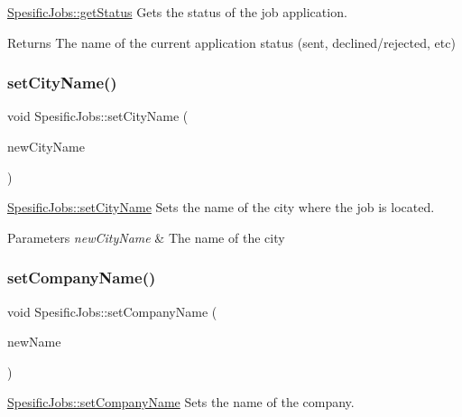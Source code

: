 \mbox{\hyperlink{class_spesific_jobs_aefe905d920961199fec0aff37a34b50d}{Spesific\+Jobs\+::get\+Status}} Gets the status of the job application. 

\begin{DoxyReturn}{Returns}
The name of the current application status (sent, declined/rejected, etc) 
\end{DoxyReturn}
\mbox{\label{class_spesific_jobs_a67b162aa9ad12ed8ffba061edff96cdf}} 
\subsubsection{\texorpdfstring{set\+City\+Name()}{setCityName()}}
{\footnotesize\ttfamily void Spesific\+Jobs\+::set\+City\+Name (\begin{DoxyParamCaption}\item[{Q\+String}]{new\+City\+Name }\end{DoxyParamCaption})}



\mbox{\hyperlink{class_spesific_jobs_a67b162aa9ad12ed8ffba061edff96cdf}{Spesific\+Jobs\+::set\+City\+Name}} Sets the name of the city where the job is located. 


\begin{DoxyParams}{Parameters}
{\em new\+City\+Name} & The name of the city \\
\hline
\end{DoxyParams}
\mbox{\label{class_spesific_jobs_aeacc56572911219fddf2f1439a70ed74}} 
\subsubsection{\texorpdfstring{set\+Company\+Name()}{setCompanyName()}}
{\footnotesize\ttfamily void Spesific\+Jobs\+::set\+Company\+Name (\begin{DoxyParamCaption}\item[{Q\+String}]{new\+Name }\end{DoxyParamCaption})}



\mbox{\hyperlink{class_spesific_jobs_aeacc56572911219fddf2f1439a70ed74}{Spesific\+Jobs\+::set\+Company\+Name}} Sets the name of the company. 


